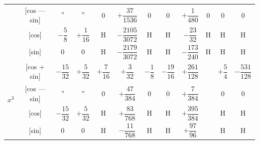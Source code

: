 \documentclass[10pt,a4paper]{article}
\begin{document}
\begin{center}
\begin{tabular}{|c|c|c|c|c|c|c|c|c|c|c|c|}
& [cos --- sin] & $"$ & $"$ & $0$ & $+\dfrac{37}{1536}$ & $0$ & $0$ & $+\dfrac{1}{480}$ & $0$ & $0$ & $0$ \\
& [cos] & $-\dfrac{5}{8}$ & $+\dfrac{1}{16}$ & H & $-\dfrac{2105}{3072}$ & H & H & $-\dfrac{23}{32}$ & H & H & H \\
& [sin] & $0$ & $0$ & H & $-\dfrac{2179}{3072}$ & H & H & $-\dfrac{173}{240}$ & H & H & H \\
\hline
\multirow{4}{*}{$x^3$} & [cos + sin] & $-\dfrac{15}{32}$ & $+\dfrac{5}{32}$ & $+\dfrac{7}{16}$ & $+\dfrac{3}{32}$ & $-\dfrac{1}{8}$ & $-\dfrac{19}{16}$ & $+\dfrac{261}{128}$ & & $+\dfrac{5}{4}$ & $-\dfrac{531}{128}$ \\
& [cos --- sin] & $"$ & $"$ & $0$ & $+\dfrac{47}{384}$ & $0$ & $0$ & $+\dfrac{7}{384}$ & & $0$ & $0$ \\
& [cos] & $-\dfrac{15}{32}$ & $+\dfrac{5}{32}$ & H & $+\dfrac{83}{768}$ & H & H & $+\dfrac{395}{384}$ & & H & H \\
& [sin] & $0$ & $0$ & H & $-\dfrac{11}{768}$ & H & H & $+\dfrac{97}{96}$ & & H & H \\
\hline
\end{tabular}
\end{center}

\newpage
\end{document}
